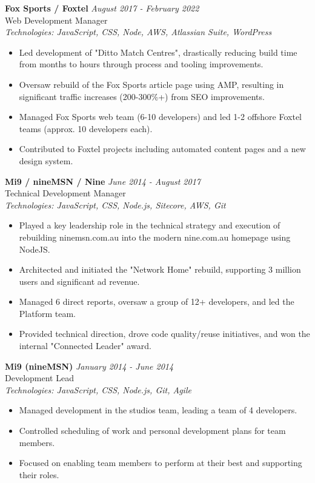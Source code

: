 \documentclass[a4paper,10pt]{article}
\begin{document}
\vspace{1em}

\textbf{Fox Sports / Foxtel} \hfill \textit{August 2017 - February 2022} \\
Web Development Manager \\
\textit{Technologies: JavaScript, CSS, Node, AWS, Atlassian Suite, WordPress}
\begin{itemize}
    \item Led development of "Ditto Match Centres", drastically reducing build time from months to hours through process and tooling improvements.
    \item Oversaw rebuild of the Fox Sports article page using AMP, resulting in significant traffic increases (200-300\%+) from SEO improvements.
    \item Managed Fox Sports web team (6-10 developers) and led 1-2 offshore Foxtel teams (approx. 10 developers each).
    \item Contributed to Foxtel projects including automated content pages and a new design system.
\end{itemize}

\vspace{1em}

\textbf{Mi9 / nineMSN / Nine} \hfill \textit{June 2014 - August 2017} \\
Technical Development Manager \\
\textit{Technologies: JavaScript, CSS, Node.js, Sitecore, AWS, Git}
\begin{itemize}
    \item Played a key leadership role in the technical strategy and execution of rebuilding ninemsn.com.au into the modern nine.com.au homepage using NodeJS.
    \item Architected and initiated the "Network Home" rebuild, supporting 3 million users and significant ad revenue.
    \item Managed 6 direct reports, oversaw a group of 12+ developers, and led the Platform team.
    \item Provided technical direction, drove code quality/reuse initiatives, and won the internal "Connected Leader" award.
\end{itemize}

\vspace{1em}

\textbf{Mi9 (nineMSN)} \hfill \textit{January 2014 - June 2014} \\
Development Lead \\
\textit{Technologies: JavaScript, CSS, Node.js, Git, Agile}
\begin{itemize}
    \item Managed development in the studios team, leading a team of 4 developers.
    \item Controlled scheduling of work and personal development plans for team members.
    \item Focused on enabling team members to perform at their best and supporting their roles.
\end{itemize}
\end{document}
